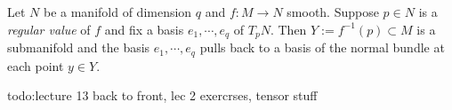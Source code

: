   Let $N$ be a manifold of dimension $q$ and $f \colon M \to N$ smooth. Suppose $p \in N$ is a \textit{regular value} of $f$ and fix a basis $e_1, \cdots ,e_q$ of $T_pN$. Then  $Y:= f ^{-1} (p) \subset M$ is a submanifold and the basis $e_1, \cdots ,e_q$ pulls back to a basis of the normal bundle at each point $y \in Y$. 


  {\color{red}todo:lecture 13 back to front, lec 2 exercrses, tensor stuff} 
